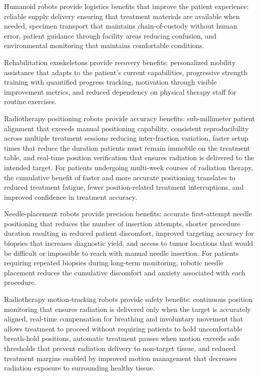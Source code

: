 Humanoid robots provide logistics benefits that improve the patient
experience: reliable supply delivery ensuring that treatment materials are
available when needed, specimen transport that maintains chain-of-custody
without human error, patient guidance through facility areas reducing
confusion, and environmental monitoring that maintains comfortable conditions.

Rehabilitation exoskeletons provide recovery benefits: personalized mobility
assistance that adapts to the patient's current capabilities, progressive
strength training with quantified progress tracking, motivation through
visible improvement metrics, and reduced dependency on physical therapy
staff for routine exercises.

Radiotherapy positioning robots provide accuracy benefits: sub-millimeter
patient alignment that exceeds manual positioning capability, consistent
reproducibility across multiple treatment sessions reducing inter-fraction
variation, faster setup times that reduce the duration patients must remain
immobile on the treatment table, and real-time position verification that
ensures radiation is delivered to the intended target. For patients undergoing
multi-week courses of radiation therapy, the cumulative benefit of faster and
more accurate positioning translates to reduced treatment fatigue, fewer
position-related treatment interruptions, and improved confidence in treatment
accuracy.

Needle-placement robots provide precision benefits: accurate first-attempt
needle positioning that reduces the number of insertion attempts, shorter
procedure duration resulting in reduced patient discomfort, improved targeting
accuracy for biopsies that increases diagnostic yield, and access to tumor
locations that would be difficult or impossible to reach with manual needle
insertion. For patients requiring repeated biopsies during long-term
monitoring, robotic needle placement reduces the cumulative discomfort and
anxiety associated with each procedure.

Radiotherapy motion-tracking robots provide safety benefits: continuous
position monitoring that ensures radiation is delivered only when the target
is accurately aligned, real-time compensation for breathing and involuntary
movement that allows treatment to proceed without requiring patients to hold
uncomfortable breath-hold positions, automatic treatment pauses when motion
exceeds safe thresholds that prevent radiation delivery to non-target tissue,
and reduced treatment margins enabled by improved motion management that
decreases radiation exposure to surrounding healthy tissue.

